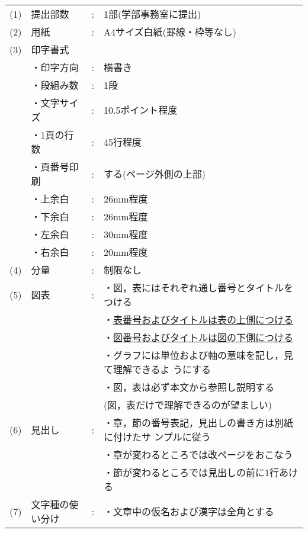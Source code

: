   \begin{tabular}{llcl}
    (1)&提出部数&:&1部(学部事務室に提出)\\
    (2)&用紙    &:&A4サイズ白紙(罫線・枠等なし)\\
    (3)&印字書式& & \\
       &\hspace*{1zw}・印字方向&:&横書き\\
       &\hspace*{1zw}・段組み数&:&1段\\
       &\hspace*{1zw}・文字サイズ&:&10.5ポイント程度\\
       &\hspace*{1zw}・1頁の行数&:&45行程度\\
       &\hspace*{1zw}・頁番号印刷&:&する(ページ外側の上部)\\
       &\hspace*{1zw}・上余白&:&26mm程度\\
       &\hspace*{1zw}・下余白&:&26mm程度\\
       &\hspace*{1zw}・左余白&:&30mm程度\\
       &\hspace*{1zw}・右余白&:&20mm程度\\
    (4)&分量&:&制限なし\\
    (5)&図表&:&・図，表にはそれぞれ通し番号とタイトルをつける\\
          & & &・\underline{表番号およびタイトルは表の上側につける}\\
          & & &・\underline{図番号およびタイトルは図の下側につける}\\
          & & &・グラフには単位および軸の意味を記し，見て理解できるよ
          うにする\\
          & & &・図，表は必ず本文から参照し説明する\\
          & & &\hspace*{1zw}(図，表だけで理解できるのが望ましい)\\
    (6)&見出し&:&・章，節の番号表記，見出しの書き方は別紙に付けたサ
          ンプルに従う\\
          & & &・章が変わるところでは改ページをおこなう\\
          & & &・節が変わるところでは見出しの前に1行あける\\
    (7)&文字種の使い分け&:&・文章中の仮名および漢字は全角とする\\

\end{tabular}
